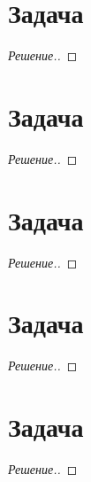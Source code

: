 \documentclass[a4paper]{article}
\theoremstyle{remark}
\begin{document}
    \section*{Задача }
	    \begin{proof}[Решение.]
		
        \end{proof}
    
    \section*{Задача }
	    \begin{proof}[Решение.]
		
        \end{proof}
    
    \section*{Задача }
	    \begin{proof}[Решение.]
		
        \end{proof}
    
    \section*{Задача }
	    \begin{proof}[Решение.]
		
        \end{proof}

    \section*{Задача }
	    \begin{proof}[Решение.]
		
        \end{proof}
\end{document}
